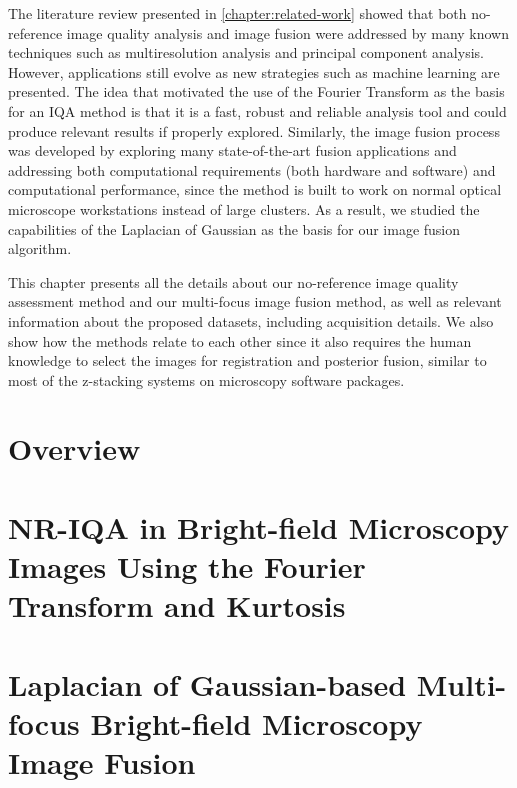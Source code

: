 The literature review  presented in \autoref{chapter:related-work} showed that both no-reference image quality analysis and image fusion were addressed by many known techniques such as multiresolution analysis and principal component analysis. However, applications still evolve as new strategies such as machine learning are presented. The idea that motivated the use of the Fourier Transform as the basis for an IQA method is that it is a fast, robust and reliable analysis tool and could produce relevant results if properly explored. Similarly, the image fusion process was developed by exploring many state-of-the-art fusion applications and addressing both computational requirements (both hardware and software) and computational performance, since the method is built to work on normal optical microscope workstations instead of large clusters. As a result, we studied the capabilities of the Laplacian of Gaussian as the basis for our image fusion algorithm. 

This chapter presents all the details about our no-reference image quality assessment method and our multi-focus image fusion method, as well as relevant information about the proposed datasets, including acquisition details. We also show how the methods relate to each other since it also requires the human knowledge to select the images for registration and posterior fusion, similar to most of the z-stacking systems on microscopy software packages.

\section{Overview}




\section{NR-IQA in Bright-field Microscopy Images Using the Fourier Transform and Kurtosis}


\section{Laplacian of Gaussian-based Multi-focus Bright-field Microscopy Image Fusion}
